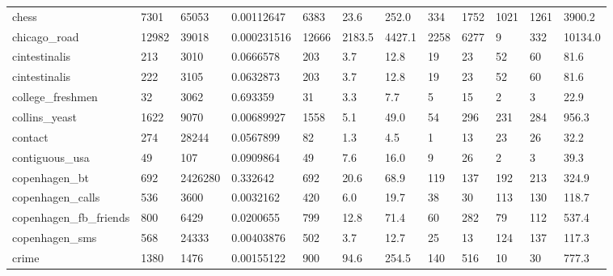 \begin{longtable}{llllllllllll}
 chess                                              & 7301       & 65053     & 0.00112647  & 6383  & 23.6   & 252.0  & 334   & 1752   & 1021   & 1261   & 3900.2  \\
 chicago\_road                                       & 12982      & 39018     & 0.000231516 & 12666 & 2183.5 & 4427.1 & 2258  & 6277   & 9      & 332    & 10134.0 \\
 cintestinalis                                      & 213        & 3010      & 0.0666578   & 203   & 3.7    & 12.8   & 19    & 23     & 52     & 60     & 81.6    \\
 cintestinalis                                      & 222        & 3105      & 0.0632873   & 203   & 3.7    & 12.8   & 19    & 23     & 52     & 60     & 81.6    \\
 college\_freshmen                                   & 32         & 3062      & 0.693359    & 31    & 3.3    & 7.7    & 5     & 15     & 2      & 3      & 22.9    \\
 collins\_yeast                                      & 1622       & 9070      & 0.00689927  & 1558  & 5.1    & 49.0   & 54    & 296    & 231    & 284    & 956.3   \\
 contact                                            & 274        & 28244     & 0.0567899   & 82    & 1.3    & 4.5    & 1     & 13     & 23     & 26     & 32.2    \\
 contiguous\_usa                                     & 49         & 107       & 0.0909864   & 49    & 7.6    & 16.0   & 9     & 26     & 2      & 3      & 39.3    \\
 copenhagen\_bt                                      & 692        & 2426280   & 0.332642    & 692   & 20.6   & 68.9   & 119   & 137    & 192    & 213    & 324.9   \\
 copenhagen\_calls                                   & 536        & 3600      & 0.0032162   & 420   & 6.0    & 19.7   & 38    & 30     & 113    & 130    & 118.7   \\
 copenhagen\_fb\_friends                              & 800        & 6429      & 0.0200655   & 799   & 12.8   & 71.4   & 60    & 282    & 79     & 112    & 537.4   \\
 copenhagen\_sms                                     & 568        & 24333     & 0.00403876  & 502   & 3.7    & 12.7   & 25    & 13     & 124    & 137    & 117.3   \\
 crime                                              & 1380       & 1476      & 0.00155122  & 900   & 94.6   & 254.5  & 140   & 516    & 10     & 30     & 777.3   \\

\end{longtable}
